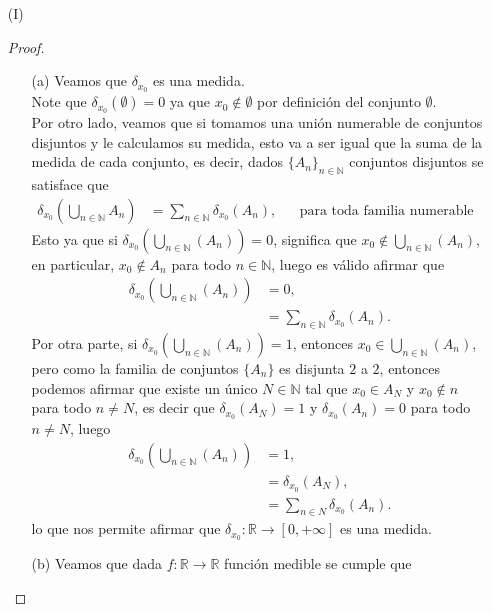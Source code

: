 \begin{enumerate}
\item[(I)]\phantom{I}\\
\begin{proof}
  \begin{enumerate}
    \item[(a)] Veamos que $\delta_{x_0}$ es una medida.\\
      Note que $\delta_{x_0}(\emptyset)=0$ ya que $x_0\notin \emptyset$ por definición del conjunto $\emptyset$.\\
      Por otro lado, veamos que si tomamos una unión numerable de conjuntos disjuntos y le calculamos su medida, esto va a ser igual que la suma de la medida de cada conjunto, es decir, dados $\{A_{n}\}_{n\in\mathbb{N}}$ conjuntos disjuntos se satisface que
      \begin{align*}
        \delta_{x_0}\left( \bigcup_{n\in\mathbb{N}}A_{n} \right)&=\sum_{n\in\mathbb{N}}\delta_{x_0}\left( A_{n} \right), &&\text{para toda familia numerable de conjuntos disjuntos.}
      \end{align*}
      Esto ya que si $\delta_{x_0}\left( \bigcup_{n\in\mathbb{N}}(A_{n}) \right)=0$, significa que $x_0\notin \bigcup_{n\in\mathbb{N}}(A_{n})$, en particular, $x_0\notin A_{n}$ para todo $n\in\mathbb{N}$, luego es válido afirmar que
      \begin{align*}
        \delta_{x_0}\left( \bigcup_{n\in\mathbb{N}}(A_{n}) \right)&=0,\\
        &=\sum_{n\in\mathbb{N}}\delta_{x_0}(A_{n}).
      \end{align*}
      Por otra parte, si $\delta_{x_0}\left( \bigcup_{n\in\mathbb{N}}(A_{n}) \right)=1$, entonces $x_0\in \bigcup_{n\in\mathbb{N}}(A_{n})$, pero como la familia de conjuntos $\{A_{n}\}$ es disjunta $2$ a $2$, entonces podemos afirmar que existe un único $N\in\mathbb{N}$ tal que $x_0\in A_N$ y $x_0\notin n$ para todo $n\neq N$, es decir que $\delta_{x_0}(A_{N})=1$ y $\delta_{x_0}(A_{n})=0$ para todo $n\neq N$, luego
      \begin{align*}
        \delta_{x_0}\left( \bigcup_{n\in\mathbb{N}}(A_{n}) \right)&=1,\\
        &=\delta_{x_0}(A_{N}),\\
        &=\sum_{n\in N}\delta_{x_0}(A_{n}).
      \end{align*}
      lo que nos permite afirmar que $\delta_{x_0}:\mathbb{R}\to[0,+\infty]$ es una medida.
    \item[(b)] Veamos que dada $f:\mathbb{R}\to\mathbb{R}$ función medible se cumple que

\end{enumerate}
\end{proof}
\end{enumerate}
